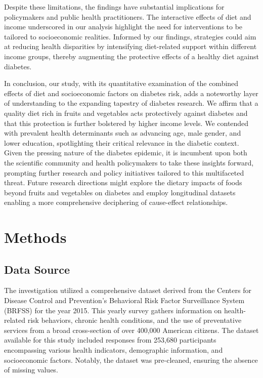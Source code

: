 \documentclass[11pt]{article}
\begin{document}
Despite these limitations, the findings have substantial implications for policymakers and public health practitioners. The interactive effects of diet and income underscored in our analysis highlight the need for interventions to be tailored to socioeconomic realities. Informed by our findings, strategies could aim at reducing health disparities by intensifying diet-related support within different income groups, thereby augmenting the protective effects of a healthy diet against diabetes. 

In conclusion, our study, with its quantitative examination of the combined effects of diet and socioeconomic factors on diabetes risk, adds a noteworthy layer of understanding to the expanding tapestry of diabetes research. We affirm that a quality diet rich in fruits and vegetables acts protectively against diabetes and that this protection is further bolstered by higher income levels. We contended with prevalent health determinants such as advancing age, male gender, and lower education, spotlighting their critical relevance in the diabetic context. Given the pressing nature of the diabetes epidemic, it is incumbent upon both the scientific community and health policymakers to take these insights forward, prompting further research and policy initiatives tailored to this multifaceted threat. Future research directions might explore the dietary impacts of foods beyond fruits and vegetables on diabetes and employ longitudinal datasets enabling a more comprehensive deciphering of cause-effect relationships.

\section*{Methods}

\subsection*{Data Source}
The investigation utilized a comprehensive dataset derived from the Centers for Disease Control and Prevention's Behavioral Risk Factor Surveillance System (BRFSS) for the year 2015. This yearly survey gathers information on health-related risk behaviors, chronic health conditions, and the use of preventative services from a broad cross-section of over 400,000 American citizens. The dataset available for this study included responses from 253,680 participants encompassing various health indicators, demographic information, and socioeconomic factors. Notably, the dataset was pre-cleaned, ensuring the absence of missing values.
\end{document}
